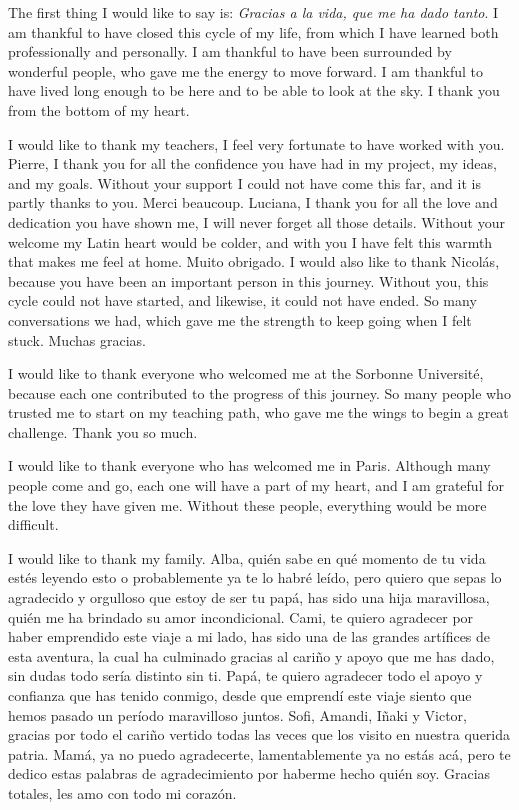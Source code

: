 %

The first thing I would like to say is: \textit{Gracias a la vida, que me ha dado tanto}. I am thankful to have closed this cycle of my life, from which I have learned both professionally and personally. I am thankful to have been surrounded by wonderful people, who gave me the energy to move forward. I am thankful to have lived long enough to be here and to be able to look at the sky. I thank you from the bottom of my heart.

I would like to thank my teachers, I feel very fortunate to have worked with you. Pierre, I thank you for all the confidence you have had in my project, my ideas, and my goals. Without your support I could not have come this far, and it is partly thanks to you. Merci beaucoup. Luciana, I thank you for all the love and dedication you have shown me, I will never forget all those details. Without your welcome my Latin heart would be colder, and with you I have felt this warmth that makes me feel at home. Muito obrigado. I would also like to thank Nicolás, because you have been an important person in this journey. Without you, this cycle could not have started, and likewise, it could not have ended. So many conversations we had, which gave me the strength to keep going when I felt stuck. Muchas gracias.

I would like to thank everyone who welcomed me at the Sorbonne Université, because each one contributed to the progress of this journey. So many people who trusted me to start on my teaching path, who gave me the wings to begin a great challenge. Thank you so much.

I would like to thank everyone who has welcomed me in Paris. Although many people come and go, each one will have a part of my heart, and I am grateful for the love they have given me. Without these people, everything would be more difficult.

I would like to thank my family. Alba, quién sabe en qué momento de tu vida estés leyendo esto o probablemente ya te lo habré leído, pero quiero que sepas lo agradecido y orgulloso que estoy de ser tu papá, has sido una hija maravillosa, quién me ha brindado su amor incondicional. Cami, te quiero agradecer por haber emprendido este viaje a mi lado, has sido una de las grandes artífices de esta aventura, la cual ha culminado gracias al cariño y apoyo que me has dado, sin dudas todo sería distinto sin ti. Papá, te quiero agradecer todo el apoyo y confianza que has tenido conmigo, desde que emprendí este viaje siento que hemos pasado un período maravilloso juntos. Sofi, Amandi, Iñaki y Victor, gracias por todo el cariño vertido todas las veces que los visito en nuestra querida patria. Mamá, ya no puedo agradecerte, lamentablemente ya no estás acá, pero te dedico estas palabras de agradecimiento por haberme hecho quién soy. Gracias totales, les amo con todo mi corazón.

